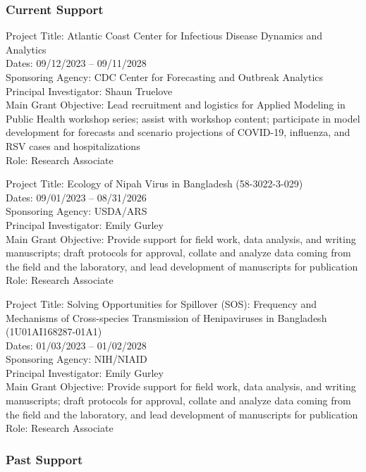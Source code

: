 \documentclass{cv}
\begin{document}
\subsubsection*{Current Support}

Project Title: Atlantic Coast Center for Infectious Disease Dynamics and Analytics \\
Dates: 09/12/2023 -- 09/11/2028 \\
Sponsoring Agency: CDC Center for Forecasting and Outbreak Analytics \\
Principal Investigator: Shaun Truelove \\
Main Grant Objective: Lead recruitment and logistics for Applied Modeling in Public Health workshop series; assist with workshop content; participate in model development for forecasts and scenario projections of COVID-19, influenza, and RSV cases and hospitalizations \\
Role: Research Associate

Project Title: Ecology of Nipah Virus in Bangladesh (58-3022-3-029) \\
Dates: 09/01/2023 -- 08/31/2026 \\
Sponsoring Agency: USDA/ARS \\
Principal Investigator: Emily Gurley \\
Main Grant Objective: Provide support for field work, data analysis, and writing manuscripts; draft protocols for approval, collate and analyze data coming from the field and the laboratory, and lead development of manuscripts for publication \\
Role: Research Associate

Project Title: Solving Opportunities for Spillover (SOS): Frequency and Mechanisms of Cross-species Transmission of Henipaviruses in Bangladesh (1U01AI168287-01A1) \\
Dates: 01/03/2023 -- 01/02/2028 \\
Sponsoring Agency: NIH/NIAID \\
Principal Investigator: Emily Gurley \\
Main Grant Objective: Provide support for field work, data analysis, and writing manuscripts; draft protocols for approval, collate and analyze data coming from the field and the laboratory, and lead development of manuscripts for publication \\
Role: Research Associate

\subsubsection*{Past Support}
\end{document}
